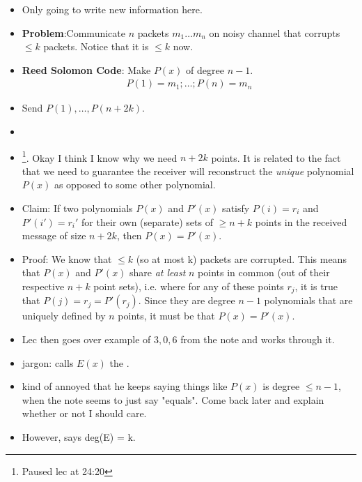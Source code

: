 \documentclass[12pt]{article}
\begin{document}
\begin{itemize}
	\item Only going to write new information here. 
	\item \textbf{Problem}:Communicate $n$ packets $m_1\ldots m_n$ on noisy channel that corrupts $\le k$ packets. Notice that it is $\le k$ now.
	\item \textbf{Reed Solomon Code}: Make $P(x)$ of degree $n-1$. 
	\begin{align}
		P(1) = m_1; \ldots ;  P(n) = m_n 
	\end{align}
	\item Send $P(1), \ldots, P(n + 2k)$. 
	\item {}
	\item \footnote{Paused lec at 24:20}. Okay I think I know why we need $n + 2k$ points. It is related to the fact that we need to guarantee the receiver will reconstruct the \textit{unique} polynomial $P(x)$ as opposed to some other polynomial.
	\item Claim: If two polynomials $P(x)$ and $P'(x)$ satisfy $P(i) = r_i$ and $P'(i') = r_i'$ for their own (separate) sets of $\ge n + k$ points in the received message of size $n + 2k$, then $P(x) = P'(x)$. 
	\item Proof: We know that $\le k$ (so at most k) packets are corrupted. This means that $P(x)$ and $P'(x)$ share \textit{at least} $n$ points in common (out of their respective $n + k$ point sets), i.e. where for any of these points $r_j$, it is true that $P(j) = r_j = P'(r_j)$. Since they are degree $n - 1$ polynomials that are uniquely defined by $n$ points, it must be that $P(x) = P'(x)$.
	
	\item Lec then goes over example of $3, 0, 6$ from the note and works through it.  
	\item jargon: calls $E(x)$ the . 
	
	\item kind of annoyed that he keeps saying things like $P(x)$ is degree $\le n - 1$, when the note seems to just say "equals". Come back later and explain whether or not I should care. 
	
	\item However, says deg(E) = k. 
\end{itemize}
\end{document}
